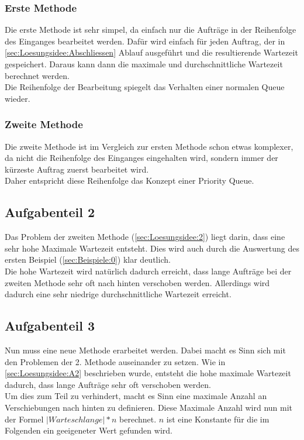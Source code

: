 \documentclass[a4paper,10pt,ngerman]{scrartcl}
\begin{document}
      \subsubsection{Erste Methode\label{sec:Loesungsidee:1}}
        Die erste Methode ist sehr simpel, da einfach nur die Aufträge in der Reihenfolge des Einganges bearbeitet werden. Dafür wird einfach für jeden Auftrag, der in \cref{sec:Loesungsidee:Abschliessen} Ablauf ausgeführt und die resultierende Wartezeit gespeichert. Daraus kann dann die maximale und durchschnittliche Wartezeit berechnet werden.\\
        Die Reihenfolge der Bearbeitung spiegelt das Verhalten einer normalen Queue wieder.
      \subsubsection{Zweite Methode\label{sec:Loesungsidee:2}}
        Die zweite Methode ist im Vergleich zur ersten Methode schon etwas komplexer, da nicht die Reihenfolge des Einganges eingehalten wird, sondern immer der kürzeste Auftrag zuerst bearbeitet wird.\\
        Daher entspricht diese Reihenfolge das Konzept einer Priority Queue.
    \subsection{Aufgabenteil 2\label{sec:Loesungsidee:A2}}
        Das Problem der zweiten Methode (\cref{sec:Loesungsidee:2}) liegt darin, dass eine sehr hohe Maximale Wartezeit entsteht. Dies wird auch durch die Auswertung des ersten Beispiel (\cref{sec:Beispiele:0}) klar deutlich.\\
        Die hohe Wartezeit wird natürlich dadurch erreicht, dass lange Aufträge bei der zweiten Methode sehr oft nach hinten verschoben werden. Allerdings wird dadurch eine sehr niedrige durchschnittliche Wartezeit erreicht.
    \subsection{Aufgabenteil 3}
        Nun muss eine neue Methode erarbeitet werden. Dabei macht es Sinn sich mit den Problemen der 2. Methode auseinander zu setzen. Wie in \cref{sec:Loesungsidee:A2} beschrieben wurde, entsteht die hohe maximale Wartezeit dadurch, dass lange Aufträge sehr oft verschoben werden.\\
        Um dies zum Teil zu verhindert, macht es Sinn eine maximale Anzahl an Verschiebungen nach hinten zu definieren. Diese Maximale Anzahl wird nun mit der Formel $|Warteschlange|*n$ berechnet. $n$ ist eine Konstante für die im Folgenden ein geeigeneter Wert gefunden wird.
\end{document}
